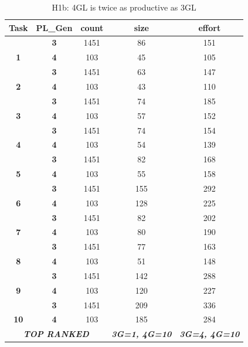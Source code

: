 \documentclass[sigconf,review]{acmart}
\begin{document}
\begin{table}

\scriptsize
\renewcommand{\baselinestretch}{0.5} 

\centering
\caption{H1b: 4GL is twice as productive as 3GL}
\label{tab:h1b}
\begin{tabular}{|c|c|c|c|c|}
\hline
\textbf{Task} & \textbf{PL\_Gen} & \textbf{count} & \textbf{size} & \textbf{effort} \\ \hline
 & \textbf{3} & 1451 & 86 & 151 \\ \cline{2-5} 
\multirow{-2}{*}{\textbf{1}} & \textbf{4} & 103 & \cellcolor[HTML]{C0C0C0}45 & \cellcolor[HTML]{C0C0C0}105 \\ \hline
 & \textbf{3} & 1451 & 63 & 147 \\ \cline{2-5} 
\multirow{-2}{*}{\textbf{2}} & \textbf{4} & 103 & \cellcolor[HTML]{C0C0C0}43 & \cellcolor[HTML]{C0C0C0}110 \\ \hline
 & \textbf{3} & 1451 & 74 & 185 \\ \cline{2-5} 
\multirow{-2}{*}{\textbf{3}} & \textbf{4} & 103 & \cellcolor[HTML]{C0C0C0}57 & \cellcolor[HTML]{C0C0C0}152 \\ \hline
 & \textbf{3} & 1451 & 74 & \cellcolor[HTML]{C0C0C0}154 \\ \cline{2-5} 
\multirow{-2}{*}{\textbf{4}} & \textbf{4} & 103 & \cellcolor[HTML]{C0C0C0}54 & \cellcolor[HTML]{C0C0C0}139 \\ \hline
 & \textbf{3} & 1451 & 82 & \cellcolor[HTML]{C0C0C0}168 \\ \cline{2-5} 
\multirow{-2}{*}{\textbf{5}} & \textbf{4} & 103 & \cellcolor[HTML]{C0C0C0}55 & \cellcolor[HTML]{C0C0C0}158 \\ \hline
 & \textbf{3} & 1451 & 155 & 292 \\ \cline{2-5} 
\multirow{-2}{*}{\textbf{6}} & \textbf{4} & 103 & \cellcolor[HTML]{C0C0C0}128 & \cellcolor[HTML]{C0C0C0}225 \\ \hline
 & \textbf{3} & 1451 & \cellcolor[HTML]{C0C0C0}82 & \cellcolor[HTML]{C0C0C0}202 \\ \cline{2-5} 
\multirow{-2}{*}{\textbf{7}} & \textbf{4} & 103 & \cellcolor[HTML]{C0C0C0}80 & \cellcolor[HTML]{C0C0C0}190 \\ \hline
 & \textbf{3} & 1451 & 77 & \cellcolor[HTML]{C0C0C0}163 \\ \cline{2-5} 
\multirow{-2}{*}{\textbf{8}} & \textbf{4} & 103 & \cellcolor[HTML]{C0C0C0}51 & \cellcolor[HTML]{C0C0C0}148 \\ \hline
 & \textbf{3} & 1451 & 142 & 288 \\ \cline{2-5} 
\multirow{-2}{*}{\textbf{9}} & \textbf{4} & 103 & \cellcolor[HTML]{C0C0C0}120 & \cellcolor[HTML]{C0C0C0}227 \\ \hline
 & \textbf{3} & 1451 & 209 & 336 \\ \cline{2-5} 
\multirow{-2}{*}{\textbf{10}} & \textbf{4} & 103 & \cellcolor[HTML]{C0C0C0}185 & \cellcolor[HTML]{C0C0C0}284 \\ \hline
\multicolumn{3}{|c|}{\textit{\textbf{TOP RANKED}}} & \textit{\textbf{3G=1, 4G=10}} & \textit{\textbf{3G=4, 4G=10}} \\ \hline
\end{tabular}
\end{table}
\end{document}
